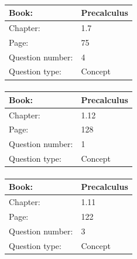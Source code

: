\documentclass{article}
\begin{document}
        
            \paragraph{}
            \begin{tabularx}{1\textwidth}{
                    p{}
                    p{}
                }
                \toprule
                Book: & Precalculus
                \\
                \midrule
                Chapter: & 1.7
                \\
                \midrule
                Page: & 75
                \\
                \midrule
                Question number: & 4
                \\
                \midrule
                Question type: & Concept
                \\
                \bottomrule
            \end{tabularx}
            
            \paragraph{}
            \begin{tabularx}{1\textwidth}{
                    p{}
                    p{}
                }
                \toprule
                Book: & Precalculus
                \\
                \midrule
                Chapter: & 1.12
                \\
                \midrule
                Page: & 128
                \\
                \midrule
                Question number: & 1
                \\
                \midrule
                Question type: & Concept
                \\
                \bottomrule
            \end{tabularx}
            
            \paragraph{}
            \begin{tabularx}{1\textwidth}{
                    p{}
                    p{}
                }
                \toprule
                Book: & Precalculus
                \\
                \midrule
                Chapter: & 1.11
                \\
                \midrule
                Page: & 122
                \\
                \midrule
                Question number: & 3
                \\
                \midrule
                Question type: & Concept
                \\
                \bottomrule
            \end{tabularx}
            
\end{document}
